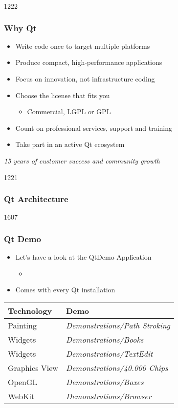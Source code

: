 \begin{slide}{1222}
  \frametitle{Why Qt}
  \begin{itemize}
  \item Write code once to target multiple platforms
  \item Produce compact, high-performance applications
  \item Focus on innovation, not infrastructure coding
  \item Choose the license that fits you
    \begin{itemize}
    \item Commercial, LGPL or GPL
    \end{itemize}
  \item Count on professional services, support and training
  \item Take part in an active Qt ecosystem
  \end{itemize}
  \vspace{1cm}
  \begin{block}{} {
      \textit{15 years of customer success and community growth}
    }
  \end{block}
\end{slide}

\begin{slide}{1221}
  \frametitle{Qt Architecture}
\end{slide}

\begin{slide}{1607}
  \frametitle{Qt Demo}
  \begin{itemize}
  \item Let's have a look at the QtDemo Application
   \begin{itemize}
    \item {}
    \end{itemize}
  \item Comes with every Qt installation
 \end{itemize}
\medskip
\begin{tabular}{l|l}
    \textbf{Technology} & \textbf{Demo} \\ \hline
    Painting & \textit{Demonstrations/Path Stroking} \\\hline
    Widgets & \textit{Demonstrations/Books} \\\hline
    Widgets & \textit{Demonstrations/TextEdit} \\\hline
    Graphics View &\textit{Demonstrations/40.000 Chips} \\\hline
    OpenGL & \textit{Demonstrations/Boxes} \\\hline
    WebKit & \textit{Demonstrations/Browser} \\\hline
  \end{tabular}
\end{slide}

